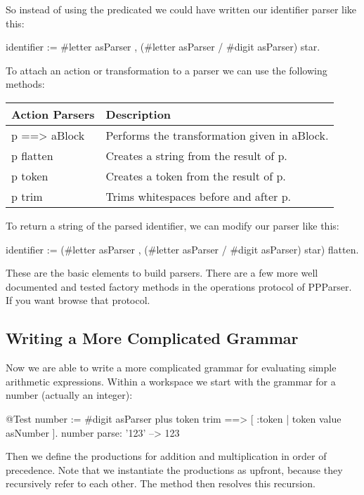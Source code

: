 \documentclass[a4paper,10pt,twoside]{book}
\begin{document}
So instead of using the  predicated we could have written
our identifier parser like this:

\begin{code}{}
identifier := #letter asParser , (#letter asParser / #digit asParser) star.
\end{code}

To attach an action or transformation to a parser we can use the following methods:

\begin{tabular}{ll}
\textbf{Action Parsers} & 	\textbf{Description}\\
\midrule
p ==> aBlock & 	Performs the transformation given in aBlock.\\
p flatten    & 	Creates a string from the result of p.\\
p token      &	Creates a token from the result of p.\\
p trim       &	Trims whitespaces before and after p.
\end{tabular}

To return a string of the parsed identifier, we can modify our parser
like this:

\begin{code}{}
identifier := (#letter asParser , (#letter asParser / #digit asParser) star) flatten.
\end{code}

These are the basic elements to build parsers. There are a few more
well documented and tested factory methods in the operations protocol
of PPParser. If you want browse that protocol.

\subsection{Writing a More Complicated Grammar}

Now we are able to write a more complicated grammar for evaluating
simple arithmetic expressions. Within a workspace we start with the
grammar for a number (actually an integer):

\begin{code}{@Test}
number :=  #digit asParser plus token trim ==> [ :token | token value asNumber ].
number parse: '123'             --> 123
\end{code}

Then we define the productions for addition and multiplication in
order of precedence. Note that we instantiate the productions as
 upfront, because they recursively refer to each
other. The method  then resolves this recursion.
\end{document}
